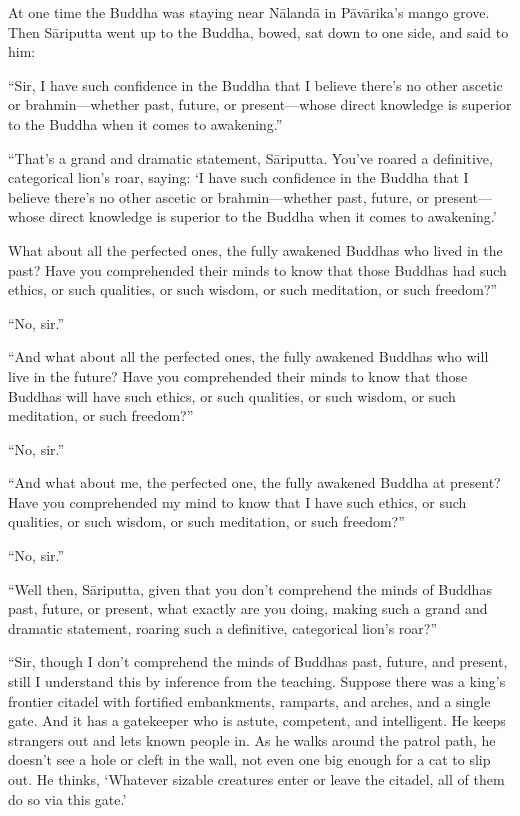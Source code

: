 \documentclass[12pt,openany]{book}%
\begin{document}
At one time the Buddha was staying near \textsanskrit{Nālandā} in \textsanskrit{Pāvārika}’s mango grove. Then \textsanskrit{Sāriputta} went up to the Buddha, bowed, sat down to one side, and said to him: 

“Sir, I have such confidence in the Buddha that I believe there’s no other ascetic or brahmin—whether past, future, or present—whose direct knowledge is superior to the Buddha when it comes to awakening.” 

“That’s a grand and dramatic statement, \textsanskrit{Sāriputta}. You’ve roared a definitive, categorical lion’s roar, saying: ‘I have such confidence in the Buddha that I believe there’s no other ascetic or brahmin—whether past, future, or present—whose direct knowledge is superior to the Buddha when it comes to awakening.’ 

What about all the perfected ones, the fully awakened Buddhas who lived in the past? Have you comprehended their minds to know that those Buddhas had such ethics, or such qualities, or such wisdom, or such meditation, or such freedom?” 

“No, sir.” 

“And what about all the perfected ones, the fully awakened Buddhas who will live in the future? Have you comprehended their minds to know that those Buddhas will have such ethics, or such qualities, or such wisdom, or such meditation, or such freedom?” 

“No, sir.” 

“And what about me, the perfected one, the fully awakened Buddha at present? Have you comprehended my mind to know that I have such ethics, or such qualities, or such wisdom, or such meditation, or such freedom?” 

“No, sir.” 

“Well then, \textsanskrit{Sāriputta}, given that you don’t comprehend the minds of Buddhas past, future, or present, what exactly are you doing, making such a grand and dramatic statement, roaring such a definitive, categorical lion’s roar?” 

“Sir, though I don’t comprehend the minds of Buddhas past, future, and present, still I understand this by inference from the teaching. Suppose there was a king’s frontier citadel with fortified embankments, ramparts, and arches, and a single gate. And it has a gatekeeper who is astute, competent, and intelligent. He keeps strangers out and lets known people in. As he walks around the patrol path, he doesn’t see a hole or cleft in the wall, not even one big enough for a cat to slip out. He thinks, ‘Whatever sizable creatures enter or leave the citadel, all of them do so via this gate.’ 
\end{document}
